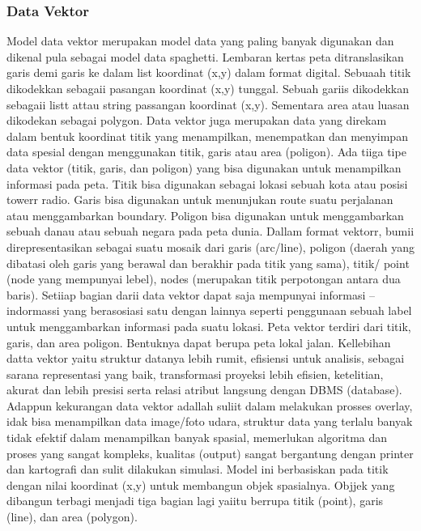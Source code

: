 \subsubsection{Data Vektor}
Model data vektor merupakan model data yang paling banyak digunakan dan dikenal pula sebagai model data spaghetti. Lembaran kertas peta ditranslasikan garis demi garis ke dalam list koordinat (x,y) dalam format digital. Sebuaah titik dikodekkan sebagaii pasangan koordinat (x,y) tunggal. Sebuah gariis dikodekkan sebagaii listt attau string passangan koordinat (x,y). Sementara area atau luasan dikodekan sebagai polygon. Data vektor juga merupakan data yang direkam dalam bentuk koordinat titik yang menampilkan, menempatkan dan menyimpan data spesial dengan menggunakan titik, garis atau area (poligon). Ada tiiga tipe data vektor (titik, garis, dan poligon) yang bisa digunakan untuk menampilkan informasi pada peta. Titik bisa digunakan sebagai lokasi sebuah kota atau posisi towerr radio. Garis bisa digunakan untuk menunjukan route suatu perjalanan atau menggambarkan boundary. Poligon bisa digunakan untuk menggambarkan sebuah danau atau sebuah negara pada peta dunia. Dallam format vektorr, bumii direpresentasikan sebagai suatu mosaik dari garis (arc/line), poligon (daerah yang dibatasi oleh garis yang berawal dan berakhir pada titik yang sama), titik/ point (node yang mempunyai lebel), nodes (merupakan titik perpotongan antara dua baris). Setiiap bagian darii data vektor dapat saja mempunyai informasi – indormassi yang berasosiasi satu dengan lainnya seperti penggunaan sebuah label untuk menggambarkan informasi pada suatu lokasi. Peta vektor terdiri dari titik, garis, dan area poligon. Bentuknya dapat berupa peta lokal jalan. Kellebihan datta vektor yaitu struktur datanya lebih rumit, efisiensi untuk analisis, sebagai sarana representasi yang baik, transformasi proyeksi lebih efisien, ketelitian, akurat dan lebih presisi serta relasi atribut langsung dengan DBMS (database). Adappun kekurangan data vektor adallah suliit dalam melakukan prosses overlay, idak bisa menampilkan data image/foto udara, struktur data yang terlalu banyak tidak efektif dalam menampilkan banyak spasial, memerlukan algoritma dan proses yang sangat kompleks, kualitas (output) sangat bergantung dengan printer dan kartografi dan sulit dilakukan simulasi.
Model ini berbasiskan pada titik dengan nilai koordinat (x,y) untuk membangun objek spasialnya. Objjek yang dibangun terbagi menjadi tiga bagian lagi yaiitu berrupa titik (point), garis (line), dan area (polygon).

 
